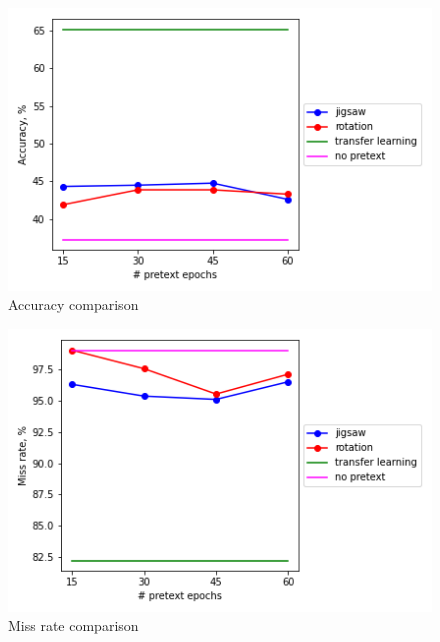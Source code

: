 \begin{figure}
    \includegraphics{images/acc}
    \caption{\label{fig:figure-1}Accuracy comparison}
\end{figure}

\begin{figure}
    \includegraphics{images/miss_rate}
    \caption{\label{fig:figure-2}Miss rate comparison}
\end{figure}



